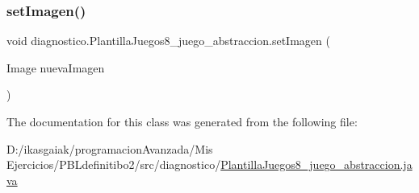 \mbox{\label{classdiagnostico_1_1_plantilla_juegos8__juego__abstraccion_a0fe0783862246c141162ff5d911ad959}} 
\subsubsection{\texorpdfstring{set\+Imagen()}{setImagen()}}
{\footnotesize\ttfamily void diagnostico.\+Plantilla\+Juegos8\+\_\+juego\+\_\+abstraccion.\+set\+Imagen (\begin{DoxyParamCaption}\item[{Image}]{nueva\+Imagen }\end{DoxyParamCaption})}



The documentation for this class was generated from the following file\+:\begin{DoxyCompactItemize}
\item 
D\+:/ikasgaiak/programacion\+Avanzada/\+Mis Ejercicios/\+P\+B\+Ldefinitibo2/src/diagnostico/\mbox{\hyperlink{_plantilla_juegos8__juego__abstraccion_8java}{Plantilla\+Juegos8\+\_\+juego\+\_\+abstraccion.\+java}}\end{DoxyCompactItemize}
